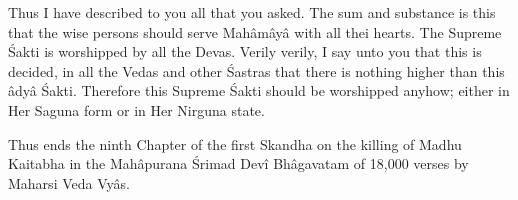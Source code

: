 Thus I have described to you all that you asked. The sum and substance is this that the wise persons should serve Mah\^am\^ay\^a with all thei hearts. The Supreme \'Sakti is worshipped by all the Devas. Verily verily, I say unto you that this is decided, in all the Vedas and other \'Sastras that there is nothing higher than this \^ady\^a \'Sakti. Therefore this Supreme \'Sakti should be worshipped anyhow; either in Her Saguna form or in Her Nirguna state.

Thus ends the ninth Chapter of the first Skandha on the killing of Madhu Kaitabha in the Mah\^apurana \'Srimad Dev\^i Bh\^agavatam of 18,000 verses by Maharsi Veda Vy\^as.